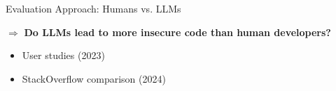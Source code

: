 \begin{frame}{Evaluation Approach: Humans vs. LLMs}

    $\Rightarrow$ \textbf{Do LLMs lead to more insecure code than human developers?}
    \vspace{0.1cm}
    \begin{itemize}
        \item User studies (2023) {\small\cite{user_study_perry_2023, user_study_sandoval_2023}} 
        \item StackOverflow comparison (2024) {\small\cite{so_firouzi_2024, so_hamer_2024}}
    \end{itemize}


    \medskip

    

\end{frame}
